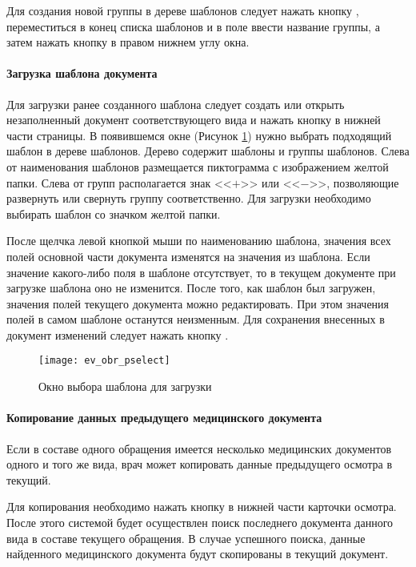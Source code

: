 {Для создания новой группы в дереве шаблонов  следует нажать кнопку , переместиться в конец списка шаблонов и в поле  ввести название группы, а затем нажать кнопку  в правом нижнем углу окна.

\paragraph{Загрузка шаблона документа}

Для загрузки ранее созданного шаблона следует создать или открыть незаполненный документ соответствующего вида и нажать кнопку  в нижней части страницы. В появившемся окне (Рисунок \ref{img_ev_obr_pselect}) нужно выбрать подходящий шаблон в дереве шаблонов. Дерево содержит шаблоны и группы шаблонов. Слева от наименования шаблонов размещается пиктограмма с изображением желтой папки. Слева от групп располагается знак <<$+$>> или <<$-$>>, позволяющие развернуть или свернуть группу соответственно. Для загрузки необходимо выбирать шаблон со значком желтой папки. 

После щелчка левой кнопкой мыши по наименованию шаблона, значения всех полей основной части документа изменятся на значения из шаблона. Если значение какого-либо поля в шаблоне отсутствует, то в текущем документе при загрузке шаблона оно не изменится. После того, как шаблон был загружен, значения полей текущего документа можно редактировать. При этом значения полей в самом шаблоне останутся неизменным. Для сохранения внесенных в документ изменений следует нажать кнопку .

 \begin{figure}[h!]\centering
   \texttt{[image: ev\_obr\_pselect]}
   \caption{Окно выбора шаблона для загрузки}
   \label{img_ev_obr_pselect}
 \end{figure}
 
\paragraph{Копирование данных предыдущего медицинского документа}

Если в составе одного обращения имеется несколько медицинских документов одного и того же вида, врач может копировать данные предыдущего осмотра в текущий.

Для копирования необходимо нажать кнопку  в нижней части карточки осмотра. После этого системой будет осуществлен поиск последнего документа данного вида в составе текущего обращения. В случае успешного поиска, данные найденного медицинского документа будут скопированы в текущий документ. 

}
